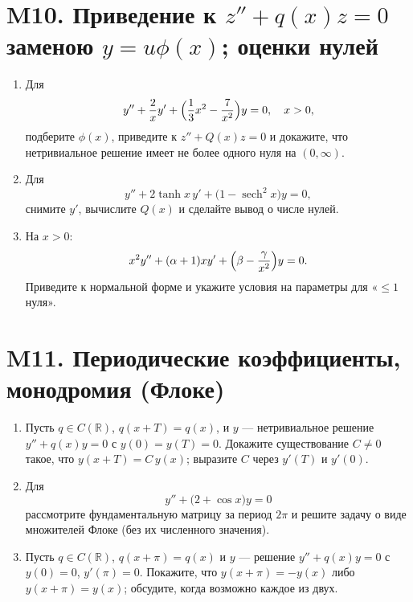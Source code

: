 \documentclass[12pt]{article}
\begin{document}
\section*{M10. Приведение к $z''+q(x)z=0$ заменою $y=u\phi(x)$; оценки нулей}
\begin{enumerate}
\item Для
\[
y''+\frac{2}{x}y'+\Bigl(\frac{1}{3}x^2-\frac{7}{x^2}\Bigr)y=0,\quad x>0,
\]
подберите $\phi(x)$, приведите к $z''+Q(x)z=0$ и докажите, что нетривиальное решение имеет не более одного нуля на $(0,\infty)$.

\item Для
\[
y''+2\tanh x\, y'+\bigl(1-\operatorname{sech}^2 x\bigr)y=0,
\]
снимите $y'$, вычислите $Q(x)$ и сделайте вывод о числе нулей.

\item На $x>0$:
\[
x^2y''+(\alpha+1)xy'+\Bigl(\beta-\frac{\gamma}{x^2}\Bigr)y=0.
\]
Приведите к нормальной форме и укажите условия на параметры для «$\le1$ нуля».
\end{enumerate}

\section*{M11. Периодические коэффициенты, монодромия (Флоке)}
\begin{enumerate}
\item Пусть $q\in C(\mathbb{R})$, $q(x+T)=q(x)$, и $y$ --- нетривиальное решение $y''+q(x)y=0$ с $y(0)=y(T)=0$. Докажите существование $C\ne0$ такое, что $y(x+T)=C\,y(x)$; выразите $C$ через $y'(T)$ и $y'(0)$.

\item Для
\[
y''+\bigl(2+\cos x\bigr)y=0
\]
рассмотрите фундаментальную матрицу за период $2\pi$ и решите задачу о виде множителей Флоке (без их численного значения).

\item Пусть $q\in C(\mathbb{R})$, $q(x+\pi)=q(x)$ и $y$ --- решение $y''+q(x)y=0$ с $y(0)=0$, $y'(\pi)=0$. Покажите, что $y(x+\pi)=-y(x)$ либо $y(x+\pi)=y(x)$; обсудите, когда возможно каждое из двух.
\end{enumerate}

\end{document}
